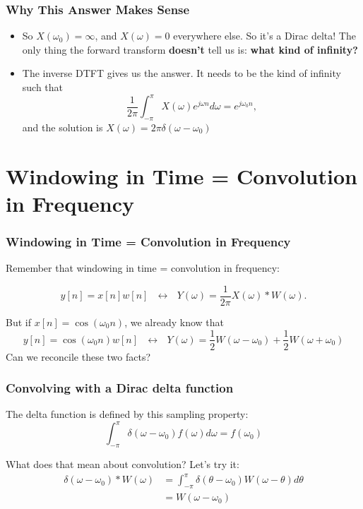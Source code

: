 \documentclass{beamer}
\begin{document}
\begin{frame}
  \frametitle{Why This Answer Makes Sense}
  \begin{itemize}
  \item So $X(\omega_0)=\infty$, and $X(\omega)=0$ everywhere else.
    So it's a Dirac delta!  The only thing the forward transform {\bf
      doesn't} tell us is: {\bf what kind of infinity?}
  \item The inverse DTFT gives us the answer.  It needs to be the kind
    of infinity such that
    \begin{displaymath}
      \frac{1}{2\pi}\int_{-\pi}^\pi X(\omega) e^{j\omega n}d\omega = e^{j\omega_0 n},
    \end{displaymath}
    and the solution is $X(\omega)=2\pi\delta(\omega-\omega_0)$
  \end{itemize}
\end{frame}

\section[Windowing]{Windowing in Time = Convolution in Frequency}
\setcounter{subsection}{1}

\begin{frame}
  \frametitle{Windowing in Time = Convolution in Frequency}

  Remember that windowing in time = convolution in frequency:

  \begin{displaymath}
    y[n]=x[n]w[n] ~~~\leftrightarrow~~~Y(\omega) = \frac{1}{2\pi} X(\omega)\ast W(\omega).
  \end{displaymath}

  But if $x[n]=\cos(\omega_0 n)$, we already know that
  \begin{displaymath}
    y[n]=\cos(\omega_0 n)w[n] ~~~\leftrightarrow~~~ Y(\omega)=
    \frac{1}{2}W(\omega-\omega_0) + \frac{1}{2}W(\omega+\omega_0)
  \end{displaymath}
  Can we reconcile these two facts?
\end{frame}

\begin{frame}
  \frametitle{Convolving with a Dirac delta function}

  The delta function is defined by this sampling property:
  \begin{displaymath}
    \int_{-\pi}^\pi \delta(\omega-\omega_0) f(\omega) d\omega = f(\omega_0)
  \end{displaymath}

  What does that mean about convolution?  Let's try it:
  \begin{align*}
    \delta(\omega-\omega_0)\ast W(\omega)
    &= \int_{-\pi}^\pi \delta(\theta-\omega_0)W(\omega-\theta)d\theta\\
    &= W(\omega-\omega_0)
  \end{align*}
\end{frame}
    
\end{document}
